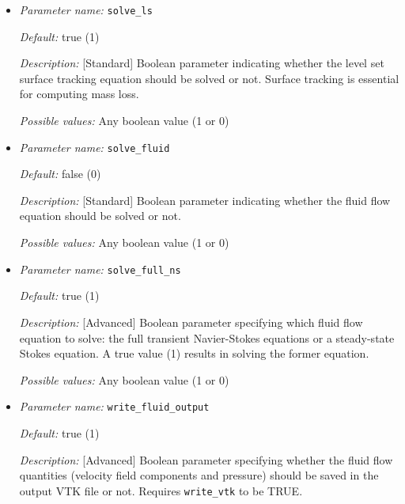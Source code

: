 \begin{itemize}
\item {\it Parameter name:} {\tt solve\_ls}
\label{parameters:solve_ls}


{\it Default:} true (1)

{\it Description:} [Standard] Boolean parameter indicating whether the level set surface tracking equation should be solved or not. Surface tracking is essential for computing mass loss.

{\it Possible values:} Any boolean value (1 or 0)


\item {\it Parameter name:} {\tt solve\_fluid}
\label{parameters:solve_fluid}


{\it Default:} false (0)

{\it Description:} [Standard] Boolean parameter indicating whether the fluid flow equation should be solved or not.

{\it Possible values:} Any boolean value (1 or 0)


\item {\it Parameter name:} {\tt solve\_full\_ns}
\label{parameters:solve_full_ns}


{\it Default:} true (1)

{\it Description:} [Advanced] Boolean parameter specifying which fluid flow equation to solve: the full transient Navier-Stokes equations or a steady-state Stokes equation. A true value (1) results in \biodeg{} solving the former equation.

{\it Possible values:} Any boolean value (1 or 0)


\item {\it Parameter name:} {\tt write\_fluid\_output}
\label{parameters:write_fluid_output}


{\it Default:} true (1)

{\it Description:} [Advanced] Boolean parameter specifying whether the fluid flow quantities (velocity field components and pressure) should be saved in the output VTK file or not. Requires {\tt write\_vtk} to be TRUE.


\end{itemize}
